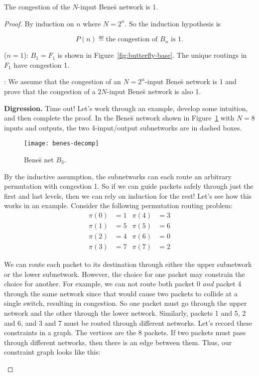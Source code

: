 \begin{theorem}
The congestion of the $N$-input Bene\u{s} network is 1.

\iffalse , where $N = 2^a$ for some $a \geq 1$\fi

\end{theorem}

\begin{proof}
By induction on $n$ where $N=2^n$.  So the induction hypothesis is

\[
P(n) \eqdef  \text{the congestion of $B_n$ is 1}.
\]

 ($n=1$): $B_1 =F_1$ is shown in
Figure~\ref{fig:butterfly-base}.  The unique routings in $F_1$ have
congestion 1.

: We assume that the congestion of an
$N=2^n$-input Bene\u{s} network is 1 and prove that the congestion of
a $2N$-input Bene\u{s} network is also 1.

\textbf{Digression.}  Time out!  Let's work through an example,
develop some intuition, and then complete the proof.  In the Bene\u{s}
network shown in Figure~\ref{fig:B_3} with $N=8$ inputs and outputs,
the two 4-input/output subnetworks are in dashed boxes.

\begin{figure}[h]
\texttt{[image: benes-decomp]}
\caption{Bene\u{s} net $B_3$.}
\label{fig:B_3}
\end{figure}

By the inductive assumption, the subnetworks can each route an
arbitrary permutation with congestion 1.  So if we can guide packets
safely through just the first and last levels, then we can rely on
induction for the rest!  Let's see how this works in an example.
Consider the following permutation routing problem:
%
\begin{align*}
\pi(0) & = 1 & \pi(4) & = 3 \\
\pi(1) & = 5 & \pi(5) & = 6 \\
\pi(2) & = 4 & \pi(6) & = 0 \\
\pi(3) & = 7 & \pi(7) & = 2
\end{align*}

We can route each packet to its destination through either the upper
subnetwork or the lower subnetwork.  However, the choice for one
packet may constrain the choice for another.  For example, we can not
route both packet 0 \textit{and} packet 4 through the same network
since that would cause two packets to collide at a single switch,
resulting in congestion.  So one packet must go through the upper
network and the other through the lower network.  Similarly, packets 1
and 5, 2 and 6, and 3 and 7 must be routed through different networks.
Let's record these constraints in a graph.  The vertices are the 8
packets.  If two packets must pass through different networks, then
there is an edge between them.  Thus, our constraint graph looks like
this:
\begin{center}
\end{center}


\end{proof}
